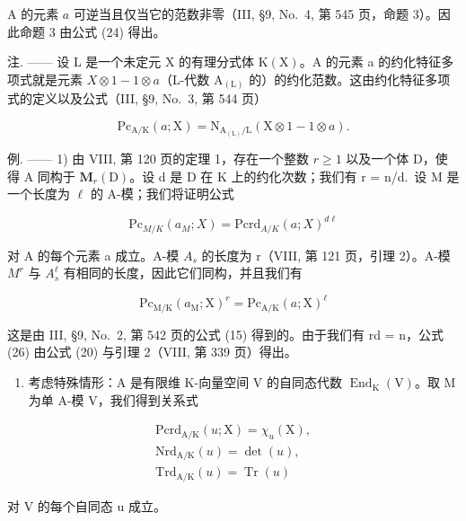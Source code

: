 A 的元素 \(a\) 可逆当且仅当它的范数非零（III, §9, No.~4, 第 545 页，命题 3）。因此命题 3 由公式 (24) 得出。

注. —— 设 L 是一个未定元 X 的有理分式体 \(\mathrm{K}(\mathrm{X})\)。A 的元素 a 的约化特征多项式就是元素 \(X \otimes 1 - 1 \otimes a\)（L-代数 \(\mathrm{A}_{(\mathrm{L})}\) 的）的约化范数。这由约化特征多项式的定义以及公式（III, §9, No.~3, 第 544 页）

\[
\mathrm{Pc} _ {\mathrm{A/K}} (a; \mathrm{X}) = \mathrm{N} _ {\mathrm{A} _ {(\mathrm{L})} / \mathrm{L}} (\mathrm{X} \otimes 1 - 1 \otimes a).\tag{25}
\]

例. —— 1) 由 VIII, 第 120 页的定理 1，存在一个整数 \(r \geqslant 1\) 以及一个体 D，使得 A 同构于 \(\mathbf{M}_{r}(\mathrm{D})\)。设 d 是 D 在 K 上的约化次数；我们有 r = n/d.~设 M 是一个长度为 \(\ell\) 的 A-模；我们将证明公式

\[
\mathrm{Pc} _ {M / K} (a_ {M} ;X) = \mathrm{Pcrd} _ {A / K} (a; X) ^ {d\ell}\tag{26}
\]

对 A 的每个元素 a 成立。A-模 \(A_{s}\) 的长度为 r（VIII, 第 121 页，引理 2）。A-模 \(M^{r}\) 与 \(A_{s}^{\ell}\) 有相同的长度，因此它们同构，并且我们有

\[
\mathrm{Pc} _ {\mathrm{M/K}} (a _ {\mathrm{M}}; \mathrm{X}) ^ {r} = \mathrm{Pc} _ {\mathrm{A/K}} (a; \mathrm{X}) ^ {\ell}
\]

这是由 III, §9, No.~2, 第 542 页的公式 (15) 得到的。由于我们有 rd = n，公式 (26) 由公式 (20) 与引理 2（VIII, 第 339 页）得出。

\begin{enumerate}
\def\labelenumi{\arabic{enumi})}
\setcounter{enumi}{1}
\tightlist
\item
  考虑特殊情形：A 是有限维 K-向量空间 V 的自同态代数 \(\operatorname{End}_{\mathrm{K}}(\mathrm{V})\)。取 M 为单 A-模 V，我们得到关系式
\end{enumerate}

\[
\begin{array}{c} \mathrm{Pcrd} _ {\mathrm{A/K}} (u; \mathrm{X}) = \chi_ {u} (\mathrm{X}), \\ \mathrm{Nrd} _ {\mathrm{A/K}} (u) = \det (u), \\ \mathrm{Trd} _ {\mathrm{A/K}} (u) = \operatorname{Tr} (u) \end{array}\tag{27}
\]

对 V 的每个自同态 u 成立。

